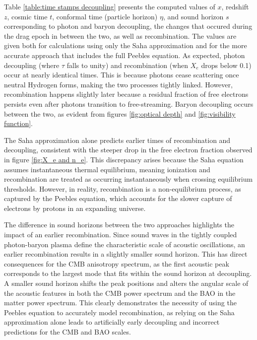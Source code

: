 \documentclass{aa}
\numberwithin{equation}{section}
\numberwithin{table}{section}
\numberwithin{figure}{section}
\begin{document}
Table \ref{table:time stamps decoupling} presents the computed values of $x$, redshift $z$, cosmic time $t$, conformal time (particle horizon) $\eta$, and sound horizon $s$ corresponding to photon and baryon decoupling, the changes that occured during the drag epoch in between the two, as well as recombination. The values are given both for calculations using only the Saha approximation and for the more accurate approach that includes the full Peebles equation. As expected, photon decoupling (where $\tau$ falls to unity) and recombination (when $X_e$ drops below 0.1) occur at nearly identical times. This is because photons cease scattering once neutral Hydrogen forms, making the two processes tightly linked. However, recombination happens slightly later because a residual fraction of free electrons persists even after photons transition to free-streaming. Baryon decoupling occurs between the two, as evident from figures \ref{fig:optical depth} and \ref{fig:visibility function}. 

The Saha approximation alone predicts earlier times of recombination and decoupling, consistent with the steeper drop in the free electron fraction observed in figure \ref{fig:X_e and n_e}. This discrepancy arises because the Saha equation assumes instantaneous thermal equilibrium, meaning ionization and recombination are treated as occurring instantaneously when crossing equilibrium thresholds. However, in reality, recombination is a non-equilibrium process, as captured by the Peebles equation, which accounts for the slower capture of electrons by protons in an expanding universe.

The difference in sound horizons between the two approaches highlights the impact of an earlier recombination. Since sound waves in the tightly coupled photon-baryon plasma define the characteristic scale of acoustic oscillations, an earlier recombination results in a slightly smaller sound horizon. This has direct consequences for the CMB anisotropy spectrum, as the first acoustic peak corresponds to the largest mode that fits within the sound horizon at decoupling. A smaller sound horizon shifts the peak positions and alters the angular scale of the acoustic features in both the CMB power spectrum and the BAO in the matter power spectrum. This clearly demonstrates the necessity of using the Peebles equation to accurately model recombination, as relying on the Saha approximation alone leads to artificially early decoupling and incorrect predictions for the CMB and BAO scales.
\end{document}
